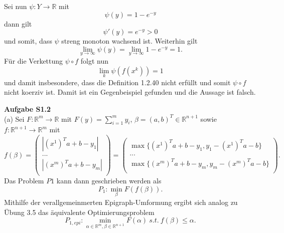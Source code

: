 \documentclass[ngerman, a4paper,12pt]{article}
\begin{document}
Sei nun $\psi : Y \rightarrow \mathbb{R}$  mit
\begin{equation*}
\psi (y) = 1- e^{-y}
\end{equation*}
dann gilt
\begin{equation*}
\psi ' (y) = e^{-y} > 0
\end{equation*}
und somit, dass $\psi$ streng monoton wachsend ist. Weiterhin gilt 
\begin{equation*}
\lim_{y \rightarrow \infty} \psi(y) = \lim_{y \rightarrow \infty} 1-e^{-y} = 1.
\end{equation*}
Für die Verkettung $\psi \circ f$ folgt nun
\begin{equation*}
\lim\limits_{k} \psi(f(x^k)) = 1
\end{equation*}
und damit insbesondere, dass die Definition 1.2.40 nicht erfüllt und somit $\psi \circ f$ nicht koerziv ist. Damit ist ein Gegenbeispiel gefunden und die Aussage ist falsch. \par
\textbf{Aufgabe S1.2} \\
(a) Sei $F: \mathbb{R}^m \rightarrow \mathbb{R}$ mit $F(y) = \sum_{i=1}^{m}y_i$, $\beta = (a, b)^T \in \mathbb{R}^{n+1}$ sowie $f: \mathbb{R}^{n+1} \rightarrow \mathbb{R}^m$ mit 
\begin{equation*}
	f(\beta) = 
					\begin{pmatrix}
					\left| (x^1)^Ta + b - y_1 \right| \\
					... \\
					\left| (x^m)^Ta + b - y_m \right| \\
					 \end{pmatrix} =
											 \begin{pmatrix}
											 \max\{(x^1)^Ta + b - y_1 , y_1 - (x^1)^Ta - b\} \\
											 ... \\
											 \max\{(x^m)^Ta + b - y_m , y_m - (x^m)^Ta - b\} \\
											 \end{pmatrix}.
\end{equation*}
Das Problem $P1$ kann dann geschrieben werden als
\begin{equation*}
	P_1: \min_{\beta} F(f(\beta)).
\end{equation*}
Mithilfe der verallgemeinmerten Epigraph-Umformung ergibt sich analog zu Übung 3.5 das äquivalente Optimierungsproblem
\begin{equation*}
	P_{1, epi}:\min_{\alpha \in \mathbb{R}^m, \beta \in \mathbb{R}^{n+1}} F(\alpha) \ s.t. \ f(\beta) \leq \alpha.
\end{equation*}
\end{document}

